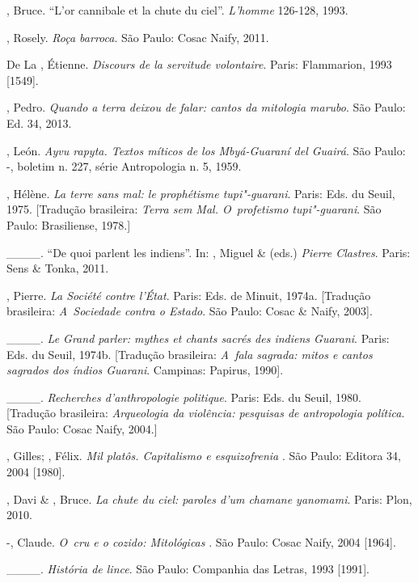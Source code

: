 \begin{Parskip}
, Bruce. ``L’or cannibale et la chute du ciel''. \emph{L’homme} 126-128,
1993.

 , Rosely. \emph{Roça barroca}. São Paulo: Cosac Naify, 2011.

De La , Étienne. \emph{Discours de la servitude volontaire}. Paris:
Flammarion, 1993 [1549].

, Pedro. \emph{Quando a terra deixou de falar: cantos da mitologia
marubo}. São Paulo: Ed. 34, 2013.

, León. \emph{Ayvu rapyta. Textos míticos de los Mbyá-Guaraní del
Guairá}. São Paulo: -, boletim n. 227, série Antropologia n. 5,
1959.

, Hélène. \emph{La terre sans mal: le prophétisme tupi"-guarani}. Paris:
Eds. du Seuil, 1975. [Tradução brasileira: \emph{Terra sem Mal. O~profetismo
tupi"-guarani}. São Paulo: Brasiliense, 1978.]

\_\_\_\_. ``De quoi parlent les indiens''. In: , Miguel \& 
(eds.) \emph{Pierre Clastres}. Paris: Sens \& Tonka, 2011.

, Pierre. \emph{La Société contre l’État}. Paris: Eds. de Minuit,
1974a. [Tradução brasileira: \emph{A~Sociedade contra o Estado}. São Paulo:
Cosac \& Naify, 2003].

\_\_\_\_. \emph{Le Grand parler: mythes et chants sacrés des indiens Guarani}.
Paris: Eds. du Seuil, 1974b. [Tradução brasileira: \emph{A~fala sagrada:
mitos e cantos sagrados dos índios Guarani}. Campinas: Papirus, 1990]. 

\_\_\_\_. \emph{Recherches d’anthropologie politique}. Paris: Eds. du Seuil, 1980.
[Tradução brasileira: \emph{Arqueologia da violência: pesquisas de
antropologia política}. São Paulo: Cosac Naify, 2004.] 

, Gilles; , Félix. \emph{Mil platôs. Capitalismo e
esquizofrenia }. São Paulo: Editora 34, 2004 [1980].

, Davi \& , Bruce. \emph{La chute du ciel: paroles d’um chamane
yanomami}. Paris: Plon, 2010.

-, Claude. \emph{O~cru e o cozido: Mitológicas }. São Paulo: Cosac
Naify, 2004 [1964].

\_\_\_\_. \emph{História de lince}. São Paulo: Companhia das Letras, 1993 [1991]. 


\end{Parskip}
